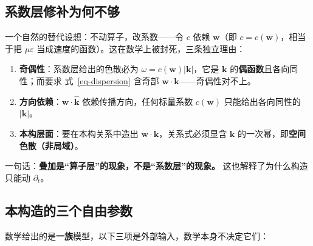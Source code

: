 \documentclass[
  chinese,
  a4paper,
  UTF8,
  12pt,
  oneside,
  openany]{ctexbook}
\providecommand{\tightlist}{%
  \setlength{\itemsep}{0pt}\setlength{\parskip}{0pt}}
\theoremstyle{plain}
\theoremstyle{plain}
\theoremstyle{plain}
\theoremstyle{definition}
\theoremstyle{plain}
\theoremstyle{plain}
\theoremstyle{remark}
\begin{document}
\subsection{系数层修补为何不够}\label{ux7cfbux6570ux5c42ux4feeux8865ux4e3aux4f55ux4e0dux591f}

一个自然的替代设想：不动算子，改系数------令 \(c\) 依赖
\(\mathbf{w}\)（即 \(c = c(\mathbf{w})\)，相当于把 \(\mu\varepsilon\)
当成速度的函数）。这在数学上被封死，三条独立理由：

\begin{enumerate}
\def\labelenumi{\arabic{enumi}.}
\tightlist
\item
  \textbf{奇偶性}：系数层给出的色散必为
  \(\omega = c(\mathbf{w})|\mathbf{k}|\)，它是 \(\mathbf{k}\)
  的\textbf{偶函数}且各向同性；而要求 式~\ref{eq-dispersion} 含奇部
  \(\mathbf{w}\cdot\mathbf{k}\)------奇偶性对不上。
\item
  \textbf{方向依赖}：\(\mathbf{w}\cdot\hat{\mathbf{k}}\)
  依赖传播方向，任何标量系数 \(c(\mathbf{w})\) 只能给出各向同性的
  \(|\mathbf{k}|\)。
\item
  \textbf{本构层面}：要在本构关系中造出
  \(\mathbf{w}\cdot\mathbf{k}\)，关系式必须显含 \(\mathbf{k}\)
  的一次幂，即\textbf{空间色散（非局域）}。
\end{enumerate}

一句话：\textbf{叠加是``算子层''的现象，不是``系数层''的现象。}
这也解释了为什么构造只能动 \(\partial_t\)。

\subsection{本构造的三个自由参数}\label{ux672cux6784ux9020ux7684ux4e09ux4e2aux81eaux7531ux53c2ux6570}

数学给出的是\textbf{一族}模型，以下三项是外部输入，数学本身不决定它们：
\end{document}
